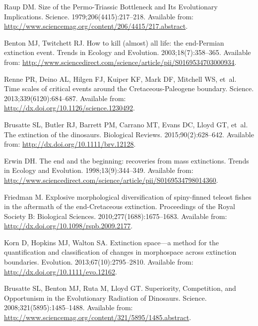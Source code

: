 \documentclass[12pt,letterpaper]{article}
\begin{document}
\begin{thebibliography}{10}

Raup DM.
\newblock Size of the {P}ermo-{T}riassic Bottleneck and Its Evolutionary
  Implications.
\newblock Science. 1979;206(4415):217--218.
\newblock Available from:
  \url{http://www.sciencemag.org/content/206/4415/217.abstract}.

Benton MJ, Twitchett RJ.
\newblock How to kill (almost) all life: the end-{P}ermian extinction event.
\newblock Trends in Ecology and Evolution. 2003;18(7):358--365.
\newblock Available from:
  \url{http://www.sciencedirect.com/science/article/pii/S0169534703000934}.

Renne PR, Deino AL, Hilgen FJ, Kuiper KF, Mark DF, Mitchell WS, et~al.
\newblock Time scales of critical events around the {C}retaceous-{P}aleogene
  boundary.
\newblock Science. 2013;339(6120):684--687.
\newblock Available from: \url{http://dx.doi.org/10.1126/science.1230492}.

Brusatte SL, Butler RJ, Barrett PM, Carrano MT, Evans DC, Lloyd GT, et~al.
\newblock The extinction of the dinosaurs.
\newblock Biological Reviews. 2015;90(2):628--642.
\newblock Available from: \url{http://dx.doi.org/10.1111/brv.12128}.

Erwin DH.
\newblock The end and the beginning: recoveries from mass extinctions.
\newblock Trends in Ecology and Evolution. 1998;13(9):344--349.
\newblock Available from:
  \url{http://www.sciencedirect.com/science/article/pii/S0169534798014360}.

Friedman M.
\newblock Explosive morphological diversification of spiny-finned teleost
  fishes in the aftermath of the {end-{C}retaceous} extinction.
\newblock Proceedings of the Royal Society B: Biological Sciences.
  2010;277(1688):1675--1683.
\newblock Available from: \url{http://dx.doi.org/10.1098/rspb.2009.2177}.

Korn D, Hopkins MJ, Walton SA.
\newblock Extinction space—a method for the quantification and classification
  of changes in morphospace across extinction boundaries.
\newblock Evolution. 2013;67(10):2795--2810.
\newblock Available from: \url{http://dx.doi.org/10.1111/evo.12162}.

Brusatte SL, Benton MJ, Ruta M, Lloyd GT.
\newblock Superiority, Competition, and Opportunism in the Evolutionary
  Radiation of Dinosaurs.
\newblock Science. 2008;321(5895):1485--1488.
\newblock Available from:
  \url{http://www.sciencemag.org/content/321/5895/1485.abstract}.


\end{thebibliography}
\end{document}
